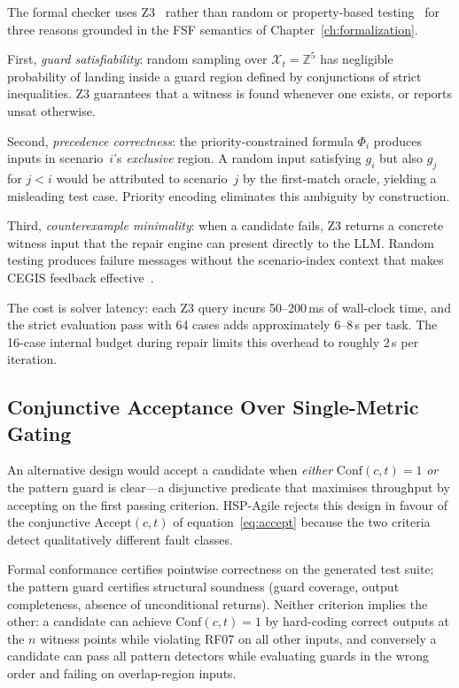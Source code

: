 The formal checker uses Z3~\citep{demoura2008z3} rather than random or
property-based testing~\citep{claessen2000quickcheck,ammann2016testing} for
three reasons grounded in the FSF semantics of Chapter~\ref{ch:formalization}.

First, \emph{guard satisfiability}: random sampling over $\mathcal{X}_t =
\mathbb{Z}^5$ has negligible probability of landing inside a guard region
defined by conjunctions of strict inequalities.  Z3 guarantees that a
witness is found whenever one exists, or reports \textsf{unsat} otherwise.

Second, \emph{precedence correctness}: the priority-constrained formula
$\Phi_i$ produces inputs in scenario~$i$'s \emph{exclusive} region.  A
random input satisfying $g_i$ but also $g_j$ for $j < i$ would be attributed
to scenario~$j$ by the first-match oracle, yielding a misleading test case.
Priority encoding eliminates this ambiguity by construction.

Third, \emph{counterexample minimality}: when a candidate fails, Z3 returns
a concrete witness input that the repair engine can present directly to the
LLM.  Random testing produces failure messages without the scenario-index
context that makes CEGIS feedback effective~\citep{lynn2024verifierloop}.

The cost is solver latency: each Z3 query incurs 50--200\,ms of wall-clock
time, and the strict evaluation pass with 64 cases adds approximately
6--8\,s per task.  The 16-case internal budget during repair limits this
overhead to roughly 2\,s per iteration.

\subsection{Conjunctive Acceptance Over Single-Metric Gating}

An alternative design would accept a candidate when \emph{either}
$\mathrm{Conf}(c,t) = 1$ \emph{or} the pattern guard is clear---a
disjunctive predicate that maximises throughput by accepting on the first
passing criterion.  HSP-Agile rejects this design in favour of the
conjunctive $\mathrm{Accept}(c,t)$ of equation~\eqref{eq:accept} because
the two criteria detect qualitatively different fault classes.

Formal conformance certifies pointwise correctness on the generated test
suite; the pattern guard certifies structural soundness (guard coverage,
output completeness, absence of unconditional returns).  Neither criterion
implies the other: a candidate can achieve $\mathrm{Conf}(c,t) = 1$ by
hard-coding correct outputs at the $n$ witness points while violating RF07
on all other inputs, and conversely a candidate can pass all pattern
detectors while evaluating guards in the wrong order and failing on
overlap-region inputs.

